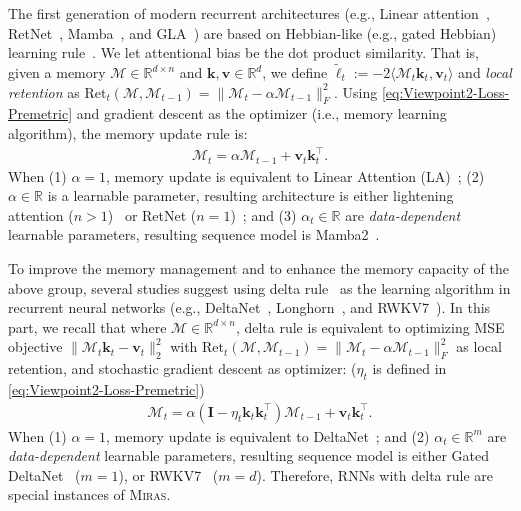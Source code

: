\documentclass{article}
\newcommand{\citep}{\parencite}
\newcommand{\framework}[0]{\textsc{Miras}}
\newcommand{\R}[0]{\mathbb{R}}
\newcommand{\vk}[0]{\mathbf{k}}
\newcommand{\vvv}[0]{\mathbf{v}}
\newcommand{\inner}[2]{\langle #1, #2 \rangle}
\newcommand{\M}[0]{\mathcal{M}}
\theoremstyle{plain}
\theoremstyle{definition}
\theoremstyle{remark}
\newcommand{\head}[1]{\vspace{1.7mm}\noindent{{\textcolor{c2}{\bf #1.}}}}
\begin{document}
\head{RNNs with Hebbian Rule} The first generation of modern recurrent architectures (e.g., Linear attention~\citep{katharopoulos2020transformers}, RetNet~\citep{sun2023retentive}, Mamba~\citep{gu2024mamba}, and GLA~\citep{yang2024gatedattn}) are based on Hebbian-like (e.g., gated Hebbian) learning rule~\citep{hebb2005organization}. We let attentional bias be the dot product similarity. That is, given a memory $\M \in \R^{d \times n}$ and $\vk, \vvv \in \R^{d}$, we define $\tilde{\ell}_t := -2 \inner{\M_t \vk_t}{\vvv_t}$ and \emph{local retention} as $\text{Ret}_t(\M, \M_{t-1}) = \| \M_t - \alpha \M_{t-1} \|_F^2$. Using \autoref{eq:Viewpoint2-Loss-Premetric} and gradient descent as the optimizer (i.e., memory learning algorithm), the memory update rule is:
\begin{align}
    \M_t = \alpha \M_{t-1} + \vvv_t \vk_t^{\top}.
\end{align}
When (1) $\alpha = 1$, memory update is equivalent to Linear Attention (LA)~\citep{katharopoulos2020transformers}; (2) $\alpha \in \R$ is a learnable parameter, resulting architecture is either lightening attention ($n > 1$)~\citep{li2025minimax} or RetNet ($n = 1$)~\citep{sun2023retentive}; and (3) $\alpha_t \in \R$ are \emph{data-dependent} learnable parameters, resulting sequence model is Mamba2~\citep{dao2024transformers}. 

\head{RNNs with Delta Rule} To improve the memory management and to enhance the memory capacity of the above group, several studies suggest using delta rule~\citep{neil2017delta, schlag2021linear} as the learning algorithm in recurrent neural networks (e.g., DeltaNet~\citep{schlag2021linear}, Longhorn~\citep{liu2024longhorn}, and RWKV7~\citep{peng2025rwkv7}). In this part, we recall that where $\M \in \R^{d \times n}$, delta rule is equivalent to optimizing MSE objective $\|\M_t \vk_t - \vvv_t\|^2_2$ with $\text{Ret}_t(\M, \M_{t-1}) = \| \M_t - \alpha \M_{t-1} \|_F^2$ as local retention, and stochastic gradient descent as optimizer: ($\eta_t$ is defined in \autoref{eq:Viewpoint2-Loss-Premetric})
\begin{align}
    \M_t = \alpha \left( \mathbf{I} - \eta_t \vk_t \vk_t^{\top}\right) \M_{t-1} + \vvv_t \vk_t^{\top}.
\end{align}
When (1) $\alpha = 1$, memory update is equivalent to DeltaNet~\citep{schlag2021linear}; and (2) $\alpha_t \in \R^m$ are \emph{data-dependent} learnable parameters, resulting sequence model is either Gated DeltaNet~\citep{yang2024gated} ($m = 1$), or RWKV7~\citep{peng2025rwkv7} ($m = d$).  
Therefore, RNNs with delta rule are special instances of \framework. 
\end{document}
